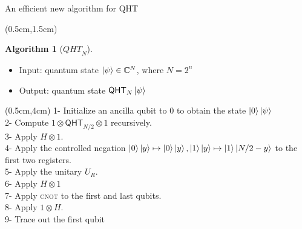 \documentclass{beamer}
\theoremstyle{definition}
\newtheorem{algorithm}{Algorithm}
\newcommand{\cas}{\mathrm{cas}}
\newcommand{\qht}{\mathsf{QHT}}
\begin{document}

        
    





\begin{frame}{An efficient new algorithm for QHT}
    
    \begin{textblock*}{12cm}(0.5cm,1.5cm)

        
        \begin{algorithm}[${QHT}_N$] 
            \begin{itemize}
                \item   Input: quantum state $\ket{\psi} \in \mathbb{C}^N$, where $N = 2^n$
                \item   Output: quantum state $\qht_N\ket{\psi}$ 
            \end{itemize}
        \end{algorithm}
    \end{textblock*}

        \begin{textblock*}{12cm}(0.5cm,4cm)
            1- Initialize an ancilla qubit to $0$ to obtain the state $\ket{0}\ket{\psi}$ \\
            2-  Compute ${1} \otimes \qht_{N / 2} \otimes {1}$ recursively.\\
            3-  Apply $H \otimes {1}$.\\
            4-  Apply  the controlled negation $\ket{0}\ket{y} \mapsto \ket{0}\ket{y}, \ket{1}\ket{y} \mapsto \ket{1}\ket{N / 2 -y}$ to the first two registers.\\
            5-  Apply the unitary $U_R$.\\
            6-  Apply $H \otimes {1}$\\
            7-  Apply \textsc{cnot} to the first and last qubits.\\
            8-  Apply ${1} \otimes H$.\\
            9-  Trace out the first qubit
        \end{textblock*}
        

\end{frame}
\end{document}
